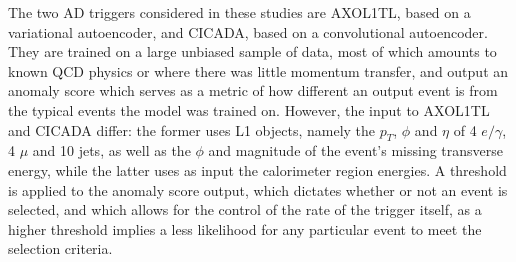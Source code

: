 The two AD triggers considered in these studies are AXOL1TL, based on a variational autoencoder, and CICADA, based on a convolutional autoencoder. They are trained on a large unbiased sample of data, most of which amounts to known QCD physics or where there was little momentum transfer, and output an anomaly score which serves as a metric of how different an output event is from the typical events the model was trained on. However, the input to AXOL1TL and CICADA differ: the former uses L1 objects, namely the $p_T$, $\phi$ and $\eta$ of 4 $e/\gamma$, 4 $\mu$ and 10 jets, as well as the $\phi$ and magnitude of the event's missing transverse energy, while the latter uses as input the calorimeter region energies. A threshold is applied to the anomaly score output, which dictates whether or not an event is selected, and which allows for the control of the rate of the trigger itself, as a higher threshold implies a less likelihood for any particular event to meet the selection criteria.






